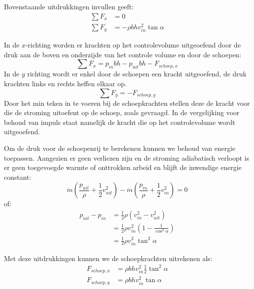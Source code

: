 \begin{voorbeeld}
	Bovenstaande uitdrukkingen invullen geeft:
	\begin{align*}
		\sum F_x &= 0 \\
		\sum F_y &= -\rho b h v_{in}^2 \tan \alpha
	\end{align*}

	In de $x$-richting worden er krachten op het controlevolume uitgeoefend door de druk aan de boven en onderzijde van het controle volume en door de schoepen:
	\begin{equation*}
		\sum F_x = p_{in} b h - p_{uit} b h - F_{schoep,x}
	\end{equation*}
	In de $y$ richting wordt er enkel door de schoepen een kracht uitgeoefend, de druk krachten links en rechts heffen elkaar op.
	\begin{equation*}
		\sum F_y = - F_{schoep,y}
	\end{equation*}
	Door het min teken in te voeren bij de schoepkrachten stellen deze de kracht voor die de stroming uitoefent op de schoep, zoals gevraagd. In de vergelijking voor behoud van impuls staat namelijk de kracht die op het controlevolume wordt uitgeoefend.

	Om de druk voor de schoepenrij te berekenen kunnen we behoud van energie toepassen. Aangezien er geen verliezen zijn en de stroming adiabatisch verloopt is er geen toegevoegde warmte of onttrokken arbeid en blijft de inwendige energie constant:
	\begin{equation*}
		\dot{m} \left(\frac{p_{uit}}{\rho} + \frac{1}{2}v^2_{uit}\right) - \dot{m} \left(\frac{p_{in}}{\rho}+ \frac{1}{2}v^2_{in} \right) = 0
	\end{equation*}
	of:
	\begin{align*}
		 p_{uit} - p_{in} &= \frac{1}{2} \rho \left(v^2_{in} - v^2_{uit} \right) \\
		                  &= \frac{1}{2} \rho v^2_{in} \left(1 - \frac{1}{\cos^2 \alpha} \right) \\
		                  &= \frac{1}{2} \rho v^2_{in} \tan^2 \alpha
	\end{align*}

	Met deze uitdrukkingen kunnen we de schoepkrachten uitrekenen als:
	\begin{align*}
		F_{schoep,x} &= \rho b h  v^2_{in} \frac{1}{2} \tan^2 \alpha \\
		F_{schoep,y} &= \rho b h v_{in}^2 \tan \alpha
	\end{align*}
\end{voorbeeld}
